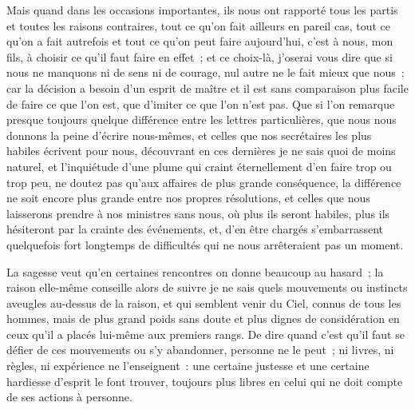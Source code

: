 \documentclass[french,twoside]{book} %
\begin{document}
Mais quand dans les occasions importantes, ils nous ont rapporté tous les partis et toutes les raisons contraires, tout ce qu’on fait ailleurs en pareil cas, tout ce qu’on a fait autrefois et tout ce qu’on peut faire aujourd’hui, c’est à nous, mon fils, à choisir ce qu’il faut faire en effet ; et ce choix-là, j’oserai vous dire que si nous ne manquons ni de sens ni de courage, nul autre ne le fait mieux que nous ; car la décision a besoin d’un esprit de maître et il est sans comparaison plus facile de faire ce que l’on est, que d’imiter ce que l’on n’est pas. Que si l’on remarque presque toujours quelque différence entre les lettres particulières, que nous nous donnons la peine d’écrire nous-mêmes, et celles que nos secrétaires les plus habiles écrivent pour nous, découvrant en ces dernières je ne sais quoi de moins naturel, et l’inquiétude d’une plume qui craint éternellement d’en faire trop ou trop peu, ne doutez pas qu’aux affaires de plus grande conséquence, la différence ne soit encore plus grande entre nos propres résolutions, et celles que nous laisserons prendre à nos ministres sans nous, où plus ils seront habiles, plus ils hésiteront par la crainte des événements, et, d’en être chargés s’embarrassent quelquefois fort longtemps de difficultés qui ne nous arrêteraient pas un moment.\par
La sagesse veut qu’en certaines rencontres on donne beaucoup au hasard ; la raison elle-même conseille alors de suivre je ne sais quels mouvements ou instincts aveugles au-dessus de la raison, et qui semblent venir du Ciel, connus de tous les hommes, mais de plus grand poids sans doute et plus dignes de considération en ceux qu’il a placés lui-même aux premiers rangs. De dire quand c’est qu’il faut se défier de ces mouvements ou s’y abandonner, personne ne le peut ; ni livres, ni règles, ni expérience ne l’enseignent : une certaine justesse et une certaine hardiesse d’esprit le font trouver, toujours plus libres en celui qui ne doit compte de ses actions à personne.\par
\end{document}
